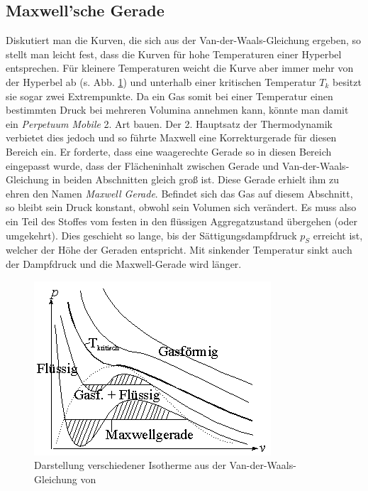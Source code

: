\documentclass[12pt,a4paper,titlepage,headinclude,bibtotoc]{scrartcl}
\begin{document}
\subsection{Maxwell'sche Gerade}
Diskutiert man die Kurven, die sich aus der Van-der-Waals-Gleichung ergeben, so stellt man leicht fest, dass die Kurven für hohe Temperaturen einer Hyperbel entsprechen.
Für kleinere Temperaturen weicht die Kurve aber immer mehr von der Hyperbel ab (s. Abb. \ref{fig:vanderwaalskurven}) und unterhalb einer kritischen Temperatur $T_k$ besitzt sie sogar zwei Extrempunkte.
Da ein Gas somit bei einer Temperatur einen bestimmten Druck bei mehreren Volumina annehmen kann, könnte man damit ein \emph{Perpetuum Mobile} 2. Art bauen.
Der 2. Hauptsatz der Thermodynamik verbietet dies jedoch und so führte Maxwell eine Korrekturgerade für diesen Bereich ein.
Er forderte, dass eine waagerechte Gerade so in diesen Bereich eingepasst wurde, dass der Flächeninhalt zwischen Gerade und Van-der-Waals-Gleichung in beiden Abschnitten gleich groß ist.
Diese Gerade erhielt ihm zu ehren den Namen \emph{Maxwell Gerade}.
Befindet sich das Gas auf diesem Abschnitt, so bleibt sein Druck konstant, obwohl sein Volumen sich verändert.
Es muss also ein Teil des Stoffes vom festen in den flüssigen Aggregatzustand übergehen (oder umgekehrt).
Dies geschieht so lange, bis der Sättigungsdampfdruck $p_S$ erreicht ist, welcher der Höhe der Geraden entspricht.
Mit sinkender Temperatur sinkt auch der Dampfdruck und die Maxwell-Gerade wird länger.
\begin{figure}[!h]
\centering
\includegraphics[scale=0.6]{vanwaalsiso}
\caption{Darstellung verschiedener Isotherme aus der Van-der-Waals-Gleichung von \protect\footnotemark}
\label{fig:vanderwaalskurven}
\end{figure}
\end{document}
